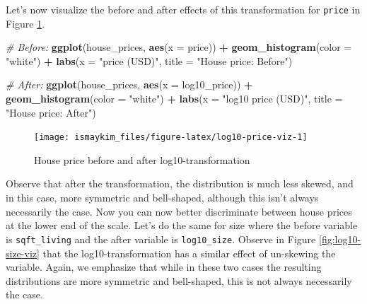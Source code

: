 \documentclass[12pt, krantz2,]{krantz}
\makeatletter
\newenvironment{Shaded}{\begin{snugshade}}{\end{snugshade}}
\newcommand{\CommentTok}[1]{\textcolor[rgb]{0.37,0.37,0.37}{\textit{#1}}}
\newcommand{\DataTypeTok}[1]{\textcolor[rgb]{0.27,0.27,0.27}{#1}}
\newcommand{\KeywordTok}[1]{\textcolor[rgb]{0.27,0.27,0.27}{\textbf{#1}}}
\newcommand{\NormalTok}[1]{#1}
\newcommand{\OperatorTok}[1]{\textcolor[rgb]{0.43,0.43,0.43}{\textbf{#1}}}
\newcommand{\StringTok}[1]{\textcolor[rgb]{0.5,0.5,0.5}{#1}}
\newenvironment{kframe}{%
\medskip{}
\setlength{\fboxsep}{.8em}
 \def\at@end@of@kframe{}%
 \ifinner\ifhmode%
  \def\at@end@of@kframe{\end{minipage}}%
  \begin{minipage}{\columnwidth}%
 \fi\fi%
 \def\FrameCommand##1{\hskip\@totalleftmargin \hskip-\fboxsep
 \colorbox{shadecolor}{##1}\hskip-\fboxsep
     \hskip-\linewidth \hskip-\@totalleftmargin \hskip\columnwidth}%
 \MakeFramed {\advance\hsize-\width
   \@totalleftmargin\z@ \linewidth\hsize
   \@setminipage}}%
 {\par\unskip\endMakeFramed%
 \at@end@of@kframe}
\renewenvironment{Shaded}{\begin{kframe}}{\end{kframe}}
\makeatother
\begin{document}
Let's now visualize the before and after effects of this transformation for \texttt{price} in Figure \ref{fig:log10-price-viz}.

\begin{Shaded}
\begin{Highlighting}[]
\CommentTok{# Before:}
\KeywordTok{ggplot}\NormalTok{(house_prices, }\KeywordTok{aes}\NormalTok{(}\DataTypeTok{x =}\NormalTok{ price)) }\OperatorTok{+}
\StringTok{  }\KeywordTok{geom_histogram}\NormalTok{(}\DataTypeTok{color =} \StringTok{"white"}\NormalTok{) }\OperatorTok{+}
\StringTok{  }\KeywordTok{labs}\NormalTok{(}\DataTypeTok{x =} \StringTok{"price (USD)"}\NormalTok{, }\DataTypeTok{title =} \StringTok{"House price: Before"}\NormalTok{)}

\CommentTok{# After:}
\KeywordTok{ggplot}\NormalTok{(house_prices, }\KeywordTok{aes}\NormalTok{(}\DataTypeTok{x =}\NormalTok{ log10_price)) }\OperatorTok{+}
\StringTok{  }\KeywordTok{geom_histogram}\NormalTok{(}\DataTypeTok{color =} \StringTok{"white"}\NormalTok{) }\OperatorTok{+}
\StringTok{  }\KeywordTok{labs}\NormalTok{(}\DataTypeTok{x =} \StringTok{"log10 price (USD)"}\NormalTok{, }\DataTypeTok{title =} \StringTok{"House price: After"}\NormalTok{)}
\end{Highlighting}
\end{Shaded}

\begin{figure}

{\centering \texttt{[image: ismaykim\_files/figure-latex/log10-price-viz-1]} 

}

\caption{House price before and after log10-transformation}\label{fig:log10-price-viz}
\end{figure}

Observe that after the transformation, the distribution is much less skewed, and in this case, more symmetric and bell-shaped, although this isn't always necessarily the case. Now you can now better discriminate between house prices at the lower end of the scale. Let's do the same for size where the before variable is \texttt{sqft\_living} and the after variable is \texttt{log10\_size}. Observe in Figure \ref{fig:log10-size-viz} that the log10-transformation has a similar effect of un-skewing the variable. Again, we emphasize that while in these two cases the resulting distributions are more symmetric and bell-shaped, this is not always necessarily the case.
\end{document}
